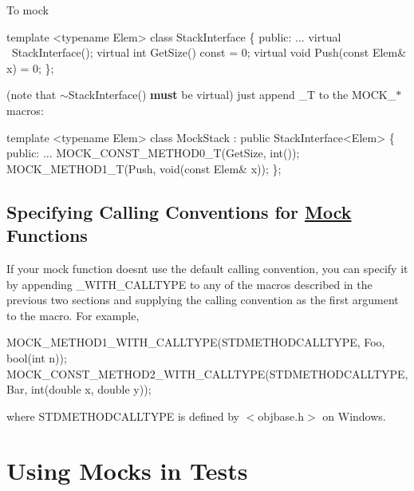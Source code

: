 To mock 
\begin{DoxyCode}
\textcolor{keyword}{template} <\textcolor{keyword}{typename} Elem>
\textcolor{keyword}{class }StackInterface \{
 \textcolor{keyword}{public}:
  ...
  \textcolor{keyword}{virtual} ~StackInterface();
  \textcolor{keyword}{virtual} \textcolor{keywordtype}{int} GetSize() \textcolor{keyword}{const} = 0;
  \textcolor{keyword}{virtual} \textcolor{keywordtype}{void} Push(\textcolor{keyword}{const} Elem& x) = 0;
\};
\end{DoxyCode}
 (note that {\ttfamily $\sim$\+Stack\+Interface()} {\bfseries must} be virtual) just append {\ttfamily \+\_\+T} to the {\ttfamily M\+O\+C\+K\+\_\+$\ast$} macros\+: 
\begin{DoxyCode}
\textcolor{keyword}{template} <\textcolor{keyword}{typename} Elem>
\textcolor{keyword}{class }MockStack : \textcolor{keyword}{public} StackInterface<Elem> \{
 \textcolor{keyword}{public}:
  ...
  MOCK\_CONST\_METHOD0\_T(GetSize, \textcolor{keywordtype}{int}());
  MOCK\_METHOD1\_T(Push, \textcolor{keywordtype}{void}(\textcolor{keyword}{const} Elem& x));
\};
\end{DoxyCode}


\subsection*{Specifying Calling Conventions for \hyperlink{classMock}{Mock} Functions}

If your mock function doesn\textquotesingle{}t use the default calling convention, you can specify it by appending {\ttfamily \+\_\+\+W\+I\+T\+H\+\_\+\+C\+A\+L\+L\+T\+Y\+PE} to any of the macros described in the previous two sections and supplying the calling convention as the first argument to the macro. For example, 
\begin{DoxyCode}
MOCK\_METHOD1\_WITH\_CALLTYPE(STDMETHODCALLTYPE, Foo, \textcolor{keywordtype}{bool}(\textcolor{keywordtype}{int} n));
MOCK\_CONST\_METHOD2\_WITH\_CALLTYPE(STDMETHODCALLTYPE, Bar, \textcolor{keywordtype}{int}(\textcolor{keywordtype}{double} x, \textcolor{keywordtype}{double} y));
\end{DoxyCode}
 where {\ttfamily S\+T\+D\+M\+E\+T\+H\+O\+D\+C\+A\+L\+L\+T\+Y\+PE} is defined by {\ttfamily $<$objbase.\+h$>$} on Windows.

\section*{Using Mocks in Tests}


